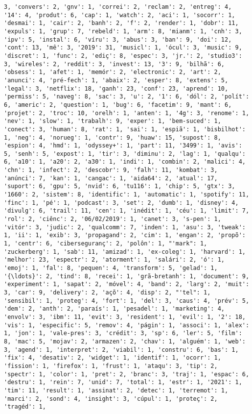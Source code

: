 \documentclass[11pt]{article}
\begin{document}
\begin{Verbatim}[commandchars=\\\{\}]
3, 'convers': 2, 'gnv': 1, 'correi': 2, 'reclam': 2, 'entreg': 4, '14': 4, 'produt': 6, 'cap': 1, 'watch': 2, 'aci': 1, 'socorr': 1, 'desmai': 1, 'cair': 2, 'banh': 2, 'f': 2, 'render': 1, 'dobr': 11, 'expuls': 1, 'grup': 7, 'rebeld': 1, 'arm': 8, 'mianm': 1, 'cnh': 3, 'ipv': 5, 'instal': 6, 'víru': 3, 'abus': 3, 'ban': 9, 'doi': 12, 'cont': 13, 'mê': 3, '2019': 31, 'musicl': 1, 'ócul': 3, 'music': 9, 'discret': 1, 'func': 2, 'ediç': 8, 'espec': 3, 'jr.': 2, 'studio3': 3, 'wireles': 2, 'reddit': 3, 'invest': 13, '3': 9, 'bilhã': 6, 'obsess': 1, 'afet': 1, 'memór': 2, 'electronic': 2, 'art': 2, 'anunci': 4, 'pré-fech': 1, 'abaix': 2, 'esper': 8, 'extens': 5, 'legal': 3, 'netflix': 18, 'ganh': 23, 'conf': 23, 'aprend': 10, 'permiss': 5, 'naveg': 8, 'sac': 3, 'u': 2, '1': 6, 'dól': 2, 'polít': 6, 'americ': 2, 'question': 1, 'bug': 6, 'facetim': 9, 'mant': 6, 'projet': 2, 'troc': 10, 'orelh': 1, 'anten': 1, '4g': 3, 'renome': 1, 'nev': 1, 'slow': 1, 'trabalh': 9, 'exper': 1, 'bem-suced': 1, 'conect': 3, 'human': 8, 'rat': 1, 'sai': 1, 'espiã': 1, 'bisbilhot': 1, 'neg': 4, 'norueg': 1, 'contr': 9, 'huaw': 15, 'supost': 8, 'espion': 4, 'hmd': 1, 'odyssey+': 1, 'part': 11, '3499': 1, 'avis': 5, 'senh': 5, 'expost': 1, 'tir': 3, 'diminu': 2, 'lag': 1, 'qualqu': 6, 'a10': 1, 'a20': 2, 'a30': 1, 'indi': 1, 'combin': 2, 'malici': 4, 'chn': 1, 'infect': 2, 'descobr': 9, 'falh': 11, 'kombat': 3, 'anúnci': 7, 'kan': 1, 'cangac': 1, 'aida64': 2, 'atual': 17, 'suport': 6, 'gpu': 5, 'nvid': 6, 'tu116': 1, 'chip': 5, 'gtx': 3, '1660': 2, 'sistem': 8, 'identific': 1, 'automatic': 1, 'spotify': 11, 'finc': 1, 'pé': 1, 'podcast': 3, 'set': 2, 'dumb': 1, 'disney': 4, 'divulg': 6, 'trail': 11, 'cen': 1, 'inédit': 1, 'céu': 1, 'limit': 7, 'rol': 2, 'ciênc': 2, '06/02/2019': 1, 'canet': 3, 's-pen': 1, 'vitór': 3, 'judic': 2, 'qualcomm': 7, 'inden': 1, 'asu': 3, 'tweak': 1, 'ii': 1, 'exib': 3, 'propagand': 2, 'cim': 1, 'engan': 2, 'propõ': 1, 'centr': 6, 'ciberseguranç': 2, 'polôn': 1, "'mark": 1, 'zuckerberg': 1, 'sab': 11, 'amizad': 1, 'ex-coleg': 1, 'harvard': 1, 'melhor': 23, 'espectr': 2, 'atorment': 1, 'salári': 2, 'ó': 1, 'emoj': 1, 'fal': 8, 'pequen': 4, 'transform': 5, 'gelad': 1, '{\ldots}': 2, 'tind': 8, 'recei': 1, 'grã-bretanh': 1, 'document': 9, 'experiment': 1, 'sapat': 2, 'móvel': 4, 'band': 2, 'larg': 2, 'muit': 3, 'car': 9, 'delivery': 2, 'açõ': 4, 'disp': 2, "'tel": 1, 'sensibil': 1, 'proteg': 4, 'fort': 1, 'del': 3, 'caus': 4, 'prév': 5, 'dem': 2, 'anth': 2, 'paraís': 1, 'pesadel': 1, 'marketing': 4, 'envolv': 3, 'ibm': 11, 'evit': 3, 'resident': 1, 'evil': 1, '2': 18, 'vis': 1, 'especific': 5, 'remov': 4, 'págin': 1, 'associ': 1, 'alex': 1, 'jon': 1, 'vale-pres': 3, 'crédit': 3, 'sp': 6, 'ler': 5, 'film': 8, 'mac': 5, 'mojav': 2, 'armazen': 2, 'chav': 1, 'alguém': 1, 'web': 3, 'agend': 1, 'interpret': 2, 'viabil': 1, 'constru': 6, 'bas': 1, 'fix': 4, 'desativ': 2, 'widget': 1, 'identif': 1, 'ocorr': 1, 'fission': 1, 'firefox': 1, 'frust': 1, 'ataqu': 3, 'tip': 2, 'spectr': 1, 'color': 1, 'pret': 2, 'branc': 3, 'traj': 1, 'espac': 6, 'destru': 1, 'rein': 7, 'unid': 7, 'total': 1, 'estr': 1, '2021': 1, 'tim': 11, 'result': 1, 'assinat': 2, 'detec': 1, 'terremot': 1, 'marci': 2, 'sond': 4, 'insight': 3, 'cúpul': 1, 'proteç': 2, 'tragéd': 1, 
\end{Verbatim}
\end{document}
